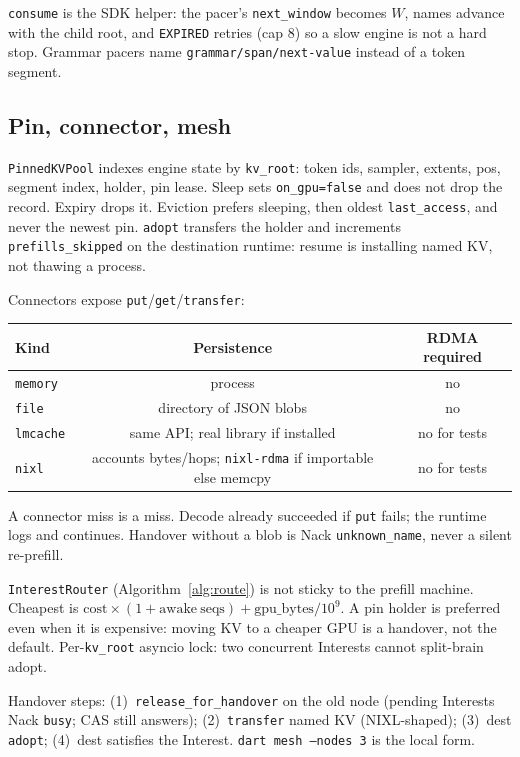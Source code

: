 \documentclass{article}
\theoremstyle{definition}
\newcommand{\kvroot}{\texttt{kv\_root}}
\begin{document}
\texttt{consume} is the SDK helper: the pacer's \texttt{next\_window} becomes $W$, names advance with the child root, and \texttt{EXPIRED} retries (cap 8) so a slow engine is not a hard stop.
Grammar pacers name \texttt{grammar/span/next-value} instead of a token segment.

\subsection{Pin, connector, mesh}
\label{sec:mesh}

\texttt{PinnedKVPool} indexes engine state by \kvroot{}: token ids, sampler, extents, pos, segment index, holder, pin lease.
Sleep sets \texttt{on\_gpu=false} and does not drop the record.
Expiry drops it.
Eviction prefers sleeping, then oldest \texttt{last\_access}, and never the newest pin.
\texttt{adopt} transfers the holder and increments \texttt{prefills\_skipped} on the destination runtime: resume is installing named KV, not thawing a process.

Connectors expose \texttt{put}/\texttt{get}/\texttt{transfer}:

\begin{center}
\small
\begin{tabular}{lcc}
\toprule
Kind & Persistence & RDMA required \\
\midrule
\texttt{memory} & process & no \\
\texttt{file} & directory of JSON blobs & no \\
\texttt{lmcache} & same API; real library if installed & no for tests \\
\texttt{nixl} & accounts bytes/hops; \texttt{nixl-rdma} if importable else memcpy & no for tests \\
\bottomrule
\end{tabular}
\end{center}

A connector miss is a miss.
Decode already succeeded if \texttt{put} fails; the runtime logs and continues.
Handover without a blob is Nack \texttt{unknown\_name}, never a silent re-prefill.

\texttt{InterestRouter} (Algorithm~\ref{alg:route}) is not sticky to the prefill machine.
Cheapest is $\mathrm{cost}\times(1+\mathrm{awake\ seqs}) + \mathrm{gpu\_bytes}/10^9$.
A pin holder is preferred even when it is expensive: moving KV to a cheaper GPU is a handover, not the default.
Per-\kvroot{} asyncio lock: two concurrent Interests cannot split-brain adopt.

Handover steps: (1)~\texttt{release\_for\_handover} on the old node (pending Interests Nack \texttt{busy}; CAS still answers); (2)~\texttt{transfer} named KV (NIXL-shaped); (3)~dest \texttt{adopt}; (4)~dest satisfies the Interest.
\texttt{dart mesh --nodes 3} is the local form.
\end{document}
